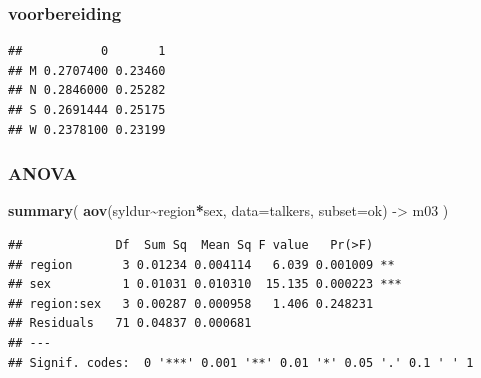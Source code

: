 \documentclass[
]{book}
\newenvironment{Shaded}{\begin{snugshade}}{\end{snugshade}}
\newcommand{\CommentTok}[1]{\textcolor[rgb]{0.56,0.35,0.01}{\textit{#1}}}
\newcommand{\DataTypeTok}[1]{\textcolor[rgb]{0.13,0.29,0.53}{#1}}
\newcommand{\FloatTok}[1]{\textcolor[rgb]{0.00,0.00,0.81}{#1}}
\newcommand{\KeywordTok}[1]{\textcolor[rgb]{0.13,0.29,0.53}{\textbf{#1}}}
\newcommand{\NormalTok}[1]{#1}
\newcommand{\OperatorTok}[1]{\textcolor[rgb]{0.81,0.36,0.00}{\textbf{#1}}}
\newcommand{\StringTok}[1]{\textcolor[rgb]{0.31,0.60,0.02}{#1}}
\begin{document}
\hypertarget{voorbereiding-6}{%
\subsubsection{voorbereiding}\label{voorbereiding-6}}

\begin{Shaded}
\end{Shaded}

\begin{verbatim}
##           0       1
## M 0.2707400 0.23460
## N 0.2846000 0.25282
## S 0.2691444 0.25175
## W 0.2378100 0.23199
\end{verbatim}

\hypertarget{anova-4}{%
\subsubsection{ANOVA}\label{anova-4}}

\begin{Shaded}
\begin{Highlighting}[]
\KeywordTok{summary}\NormalTok{( }\KeywordTok{aov}\NormalTok{(syldur}\OperatorTok{\textasciitilde{}}\NormalTok{region}\OperatorTok{*}\NormalTok{sex, }\DataTypeTok{data=}\NormalTok{talkers, }\DataTypeTok{subset=}\NormalTok{ok) {-}\textgreater{}}\StringTok{ }\NormalTok{m03 )}
\end{Highlighting}
\end{Shaded}

\begin{verbatim}
##             Df  Sum Sq  Mean Sq F value   Pr(>F)    
## region       3 0.01234 0.004114   6.039 0.001009 ** 
## sex          1 0.01031 0.010310  15.135 0.000223 ***
## region:sex   3 0.00287 0.000958   1.406 0.248231    
## Residuals   71 0.04837 0.000681                     
## ---
## Signif. codes:  0 '***' 0.001 '**' 0.01 '*' 0.05 '.' 0.1 ' ' 1
\end{verbatim}
\end{document}

